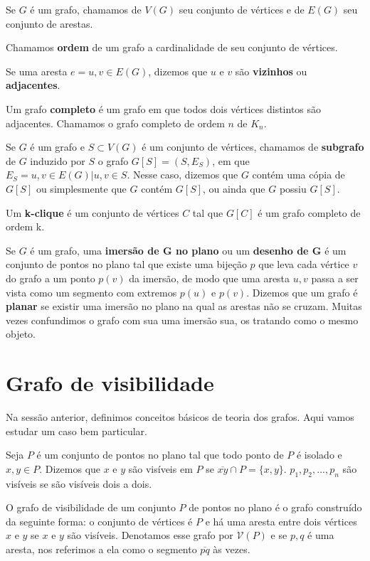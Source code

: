\documentclass[a4paper]{book}
\begin{document}
Se $G$ é um grafo, chamamos de $V(G)$ seu conjunto de vértices e de $E(G)$ seu conjunto de arestas.

Chamamos \textbf{ordem} de um grafo a cardinalidade de seu conjunto de vértices.

Se uma aresta $e={u,v}\in E(G)$, dizemos que $u$ e $v$ são \textbf{vizinhos} ou \textbf{adjacentes}.

Um grafo \textbf{completo} é um grafo em que todos dois vértices distintos são adjacentes. Chamamos o grafo completo de ordem $n$ de $K_n$.

Se $G$ é um grafo e  $S\subset V(G)$ é um conjunto de vértices, chamamos de \textbf{subgrafo} de $G$ induzido por $S$ o grafo $G[S]=(S,E_S)$, em que $E_S={{u,v}\in E(G)|u,v\in S}$. Nesse caso, dizemos que $G$ contém uma cópia de $G[S]$ ou simplesmente que $G$ contém $G[S]$, ou ainda que $G$ possiu $G[S]$.

Um \textbf{k-clique} é um conjunto de vértices $C$ tal que $G[C]$ é um grafo completo de ordem k.

Se $G$ é um grafo, uma \textbf{imersão de G no plano} ou um \textbf{desenho de G} é um conjunto de pontos no plano tal que existe uma bijeção $p$ que leva cada vértice $v$ do grafo a um ponto $p(v)$ da imersão, de modo que uma aresta ${u,v}$ passa a ser vista como um segmento com extremos $p(u)$ e $p(v)$. Dizemos que um grafo é \textbf{planar} se existir uma imersão no plano na qual as arestas não se cruzam. Muitas vezes confundimos o grafo com sua uma imersão sua, os tratando como o mesmo objeto.

\section{Grafo de visibilidade}
Na sessão anterior, definimos conceitos básicos de teoria dos grafos. Aqui vamos estudar um caso bem particular.

Seja $P$ é um conjunto de pontos no plano tal que todo ponto de $P$ é isolado e $x,y\in P$. Dizemos que $x$ e $y$ são visíveis em $P$ se $\overline{xy}\cap P =\{x,y\}$. $p_1, p_2, ..., p_n$ são visíveis se são visíveis dois a dois.

O grafo de visibilidade de um conjunto $P$ de pontos no plano é o grafo construído da seguinte forma: o conjunto de vértices é $P$ e há uma aresta entre dois vértices $x$ e $y$ se $x$ e $y$ são visíveis. Denotamos esse grafo por $\mathcal V(P)$ e se ${p,q}$ é uma aresta, nos referimos a ela como o segmento $\overline{pq}$ às vezes.
\end{document}

